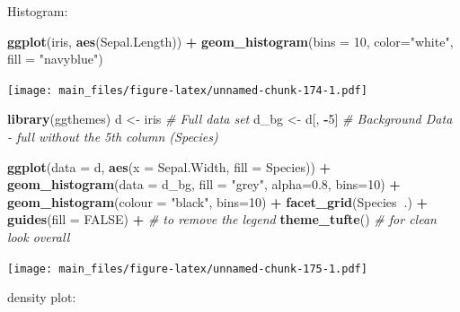 \documentclass[]{book}
\newenvironment{Shaded}{\begin{snugshade}}{\end{snugshade}}
\newcommand{\KeywordTok}[1]{\textcolor[rgb]{0.13,0.29,0.53}{\textbf{#1}}}
\newcommand{\DataTypeTok}[1]{\textcolor[rgb]{0.13,0.29,0.53}{#1}}
\newcommand{\DecValTok}[1]{\textcolor[rgb]{0.00,0.00,0.81}{#1}}
\newcommand{\FloatTok}[1]{\textcolor[rgb]{0.00,0.00,0.81}{#1}}
\newcommand{\StringTok}[1]{\textcolor[rgb]{0.31,0.60,0.02}{#1}}
\newcommand{\CommentTok}[1]{\textcolor[rgb]{0.56,0.35,0.01}{\textit{#1}}}
\newcommand{\OtherTok}[1]{\textcolor[rgb]{0.56,0.35,0.01}{#1}}
\newcommand{\OperatorTok}[1]{\textcolor[rgb]{0.81,0.36,0.00}{\textbf{#1}}}
\newcommand{\NormalTok}[1]{#1}
\begin{document}
Histogram:

\begin{Shaded}
\begin{Highlighting}[]
\KeywordTok{ggplot}\NormalTok{(iris, }\KeywordTok{aes}\NormalTok{(Sepal.Length)) }\OperatorTok{+}\StringTok{ }
\StringTok{  }\KeywordTok{geom_histogram}\NormalTok{(}\DataTypeTok{bins =} \DecValTok{10}\NormalTok{, }\DataTypeTok{color=}\StringTok{"white"}\NormalTok{, }\DataTypeTok{fill =} \StringTok{"navyblue"}\NormalTok{) }
\end{Highlighting}
\end{Shaded}

\texttt{[image: main\_files/figure-latex/unnamed-chunk-174-1.pdf]}

\begin{Shaded}
\begin{Highlighting}[]
\KeywordTok{library}\NormalTok{(ggthemes)}
\NormalTok{d <-}\StringTok{ }\NormalTok{iris        }\CommentTok{# Full data set}
\NormalTok{d_bg <-}\StringTok{ }\NormalTok{d[, }\OperatorTok{-}\DecValTok{5}\NormalTok{]  }\CommentTok{# Background Data - full without the 5th column (Species)}

\KeywordTok{ggplot}\NormalTok{(}\DataTypeTok{data =}\NormalTok{ d, }\KeywordTok{aes}\NormalTok{(}\DataTypeTok{x =}\NormalTok{ Sepal.Width, }\DataTypeTok{fill =}\NormalTok{ Species)) }\OperatorTok{+}
\StringTok{  }\KeywordTok{geom_histogram}\NormalTok{(}\DataTypeTok{data =}\NormalTok{ d_bg, }\DataTypeTok{fill =} \StringTok{"grey"}\NormalTok{, }\DataTypeTok{alpha=}\FloatTok{0.8}\NormalTok{, }\DataTypeTok{bins=}\DecValTok{10}\NormalTok{) }\OperatorTok{+}
\StringTok{  }\KeywordTok{geom_histogram}\NormalTok{(}\DataTypeTok{colour =} \StringTok{"black"}\NormalTok{, }\DataTypeTok{bins=}\DecValTok{10}\NormalTok{) }\OperatorTok{+}
\StringTok{  }\KeywordTok{facet_grid}\NormalTok{(Species}\OperatorTok{~}\NormalTok{.) }\OperatorTok{+}
\StringTok{  }\KeywordTok{guides}\NormalTok{(}\DataTypeTok{fill =} \OtherTok{FALSE}\NormalTok{) }\OperatorTok{+}\StringTok{  }\CommentTok{# to remove the legend}
\StringTok{  }\KeywordTok{theme_tufte}\NormalTok{()          }\CommentTok{# for clean look overall}
\end{Highlighting}
\end{Shaded}

\texttt{[image: main\_files/figure-latex/unnamed-chunk-175-1.pdf]}

density plot:

\begin{Shaded}
\end{Shaded}
\end{document}
